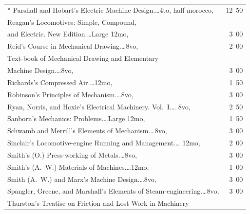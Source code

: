 \documentclass[a4paper,12pt]{book}[2004/02/16]
\theoremstyle{ilemma}
\theoremstyle{itheorem}
\theoremstyle{iother}
\theoremstyle{icorollary}
\theoremstyle{numcorollary}
\theoremstyle{idefinition}
\begin{document}
\begin{longtable}{@{}l@{ }r@{}}
* Parshall and Hobart's Electric Machine Design.\dotfill\ldots 4to,
  half morocco, & 12\ 50\\

Reagan's Locomotives: Simple, Compound,\\

\nopagebreak

\indent\indent and Electric. New Edition.\dotfill\ldots Large 12mo, &
3\ 00\\

Reid's Course in Mechanical Drawing.\dotfill\ldots 8vo, & 2\ 00\\

\indent Text-book of Mechanical Drawing and Elementary\\

\nopagebreak

\indent\indent Machine Design.\dotfill\ldots 8vo, & 3\ 00\\

Richards's Compressed Air.\dotfill\ldots 12mo, & 1\ 50\\

Robinson's Principles of Mechanism.\dotfill\ldots 8vo, & 3\ 00\\

Ryan, Norris, and Hoxie's Electrical Machinery. Vol.~I.\dotfill\ldots
8vo, & 2\ 50\\

Sanborn's Mechanics: Problems.\dotfill\ldots Large 12mo, & 1\ 50\\

Schwamb and Merrill's Elements of Mechanism.\dotfill\ldots 8vo, & 3\ 00\\

Sinclair's Locomotive-engine Running and Management.\dotfill\ldots
12mo, & 2\ 00\\

Smith's (O.) Press-working of Metals.\dotfill\ldots 8vo, & 3\ 00\\

Smith's (A.~W.) Materials of Machines.\dotfill\ldots 12mo, & 1\ 00\\

Smith (A.~W.) and Marx's Machine Design.\dotfill\ldots 8vo, & 3\ 00\\

Spangler, Greene, and Marshall's Elements of
Steam-engineering.\dotfill\ldots 8vo, & 3\ 00\\

Thurston's Treatise on Friction and Lost Work in Machinery\\


\end{longtable}
\end{document}
